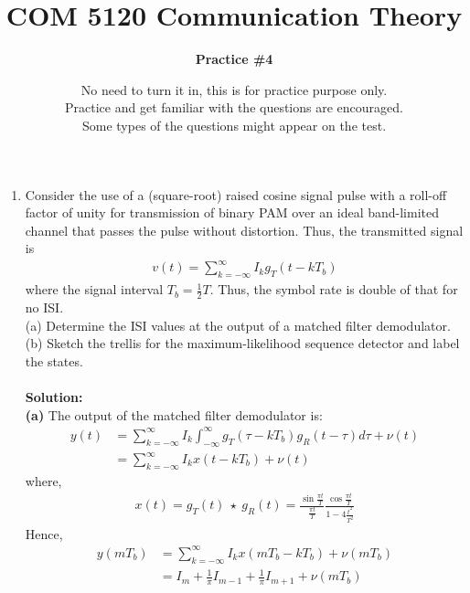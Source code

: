 \documentclass[a4paper,12pt]{article}
\title{\textbf{COM 5120 Communication Theory}}
\author{\textbf{Practice \#4}}
\date{No need to turn it in, this is for practice purpose only.  \\
Practice and get familiar with the questions are encouraged. \\ 
Some types of the questions might appear on the test. \\}
\begin{document}
    \maketitle
    \begin{enumerate}
        \item 
            Consider the use of a (square-root) raised cosine signal pulse with a roll-off factor of unity for transmission of binary PAM over an ideal band-limited channel that passes the pulse without distortion. Thus, the transmitted signal is 
            \begin{align*}
                v(t) = \sum_{k = -\infty}^{\infty} I_k g_T(t - kT_b)
            \end{align*}
            where the signal interval $T_b = \frac{1}{2}T$. Thus, the symbol rate is double of that for no ISI. \\ 
            (a) Determine the ISI values at the output of a matched filter demodulator. \\
            (b)  Sketch the trellis for the maximum-likelihood sequence detector and label the states. \\ \\
            \textbf{Solution:} \\
            \textbf{(a)} The output of the matched filter demodulator is: 
            \begin{align*}
                y(t) &= \sum_{k = -\infty}^{\infty} I_k \int_{-\infty}^{\infty} g_T(\tau - kT_b)g_R(t - \tau) d\tau + \nu(t) \\ 
                     &= \sum_{k = -\infty}^{\infty} I_k x(t - kT_b) + \nu(t)
            \end{align*}
            where, 
            \begin{align*}
                x(t) = g_T(t) \ \star \ g_R(t) = \frac{\sin \frac{\pi t}{T}}{\frac{\pi t}{T}} \frac{\cos \frac{\pi t}{T}}{1 - 4 \frac{t^2}{T^2}}
            \end{align*}
            Hence, 
            \begin{align*}
                y(mT_b) &= \sum_{k = -\infty}^{\infty} I_k x(mT_b - kT_b) + \nu(mT_b) \\ 
                        &= I_m + \frac{1}{\pi} I_{m - 1} + \frac{1}{\pi} I_{m + 1} + \nu(mT_b)

\end{align*}
\end{enumerate}
\end{document}
